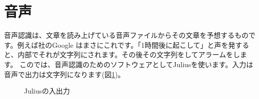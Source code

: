 \section{音声}
音声認識は、文章を読み上げている音声ファイルからその文章を予想するものです。例えば社のGoogle はまさにこれです。「1時間後に起こして」と声を発すると、内部でそれが文字列にされます。その後その文字列をしてアラームをします。
このでは、音声認識のためのソフトウェアとしてJuliusを使います。入力は音声で出力は文字列になります(図\ref{Juliusの入出力})。

\begin{figure}[H]
\begin{center}
    
    \caption{Juliusの入出力}
    \label{Juliusの入出力}
\end{center}
\end{figure}

\begin{tcolorbox}[title=\useOmetoi]
\begin{enumerate}
\end{enumerate}
\end{tcolorbox}

